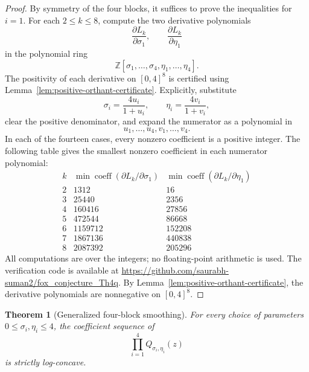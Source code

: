 \documentclass[11pt]{amsart}
\newtheorem{theorem}{Theorem}[section]
\newcommand{\Z}{\mathbb Z}
\newcommand{\codeurl}{\url{https://github.com/saurabh-suman2/fox_conjecture_Th4q}}
\begin{document}
\begin{proof}
By symmetry of the four blocks, it suffices to prove the inequalities for \(i=1\).  For each \(2\le k\le8\), compute the two derivative polynomials
\[
        \frac{\partial L_k}{\partial\sigma_1},
        \qquad
        \frac{\partial L_k}{\partial\eta_1}
\]
in the polynomial ring
\[
        \Z[\sigma_1,\ldots,\sigma_4,\eta_1,\ldots,\eta_4].
\]
The positivity of each derivative on \([0,4]^8\) is certified using Lemma~\ref{lem:positive-orthant-certificate}.  Explicitly, substitute
\[
        \sigma_i=\frac{4u_i}{1+u_i},
        \qquad
        \eta_i=\frac{4v_i}{1+v_i},
\]
clear the positive denominator, and expand the numerator as a polynomial in
\[
        u_1,\ldots,u_4,v_1,\ldots,v_4.
\]
In each of the fourteen cases, every nonzero coefficient is a positive integer.  The following table gives the smallest nonzero coefficient in each numerator polynomial:
\[
\begin{array}{c|cc}
 k
 & \min\operatorname{coeff}\left(\partial L_k/\partial\sigma_1\right)
 & \min\operatorname{coeff}\left(\partial L_k/\partial\eta_1\right) \\
\hline
2 & 1312    & 16     \\
3 & 25440   & 2356   \\
4 & 160416  & 27856  \\
5 & 472544  & 86668  \\
6 & 1159712 & 152208 \\
7 & 1867136 & 440838 \\
8 & 2087392 & 205296
\end{array}
\]
All computations are over the integers; no floating-point arithmetic is used.  The verification code is available at \codeurl.  By Lemma~\ref{lem:positive-orthant-certificate}, the derivative polynomials are nonnegative on \([0,4]^8\).
\end{proof}

\begin{theorem}[Generalized four-block smoothing]\label{thm:general-fourblock}
For every choice of parameters \(0\le\sigma_i,\eta_i\le4\), the coefficient sequence of
\[
        \prod_{i=1}^4Q_{\sigma_i,\eta_i}(z)
\]
is strictly log-concave.
\end{theorem}
\end{document}
